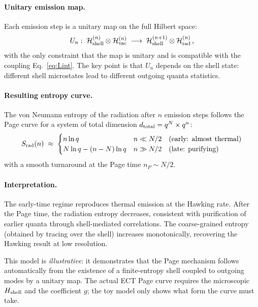 \documentclass[11pt,a4paper]{article}
\numberwithin{equation}{section}
\begin{document}
\paragraph{Unitary emission map.}
Each emission step is a unitary map on the full Hilbert space:
\begin{equation}
U_n:\;
\mathcal{H}_{\rm shell}^{(n)}\otimes\mathcal{H}_{\rm vac}^{(n)}
\;\longrightarrow\;
\mathcal{H}_{\rm shell}^{(n+1)}\otimes\mathcal{H}_{\rm rad}^{(n)}\,,
\label{eq:emission_map}
\end{equation}
with the only constraint that the map is unitary and is compatible with
the coupling Eq.~\eqref{eq:Lint}.
The key point is that $U_n$ depends on the shell state: different shell
microstates lead to different outgoing quanta statistics.

\paragraph{Resulting entropy curve.}
The von Neumann entropy of the radiation after $n$ emission steps follows
the Page curve for a system of total dimension
$d_{\rm total} = q^N \times q^n$:
\begin{equation}
S_{\rm rad}(n)
\;\approx\;
\begin{cases}
n\ln q & n \ll N/2\quad(\text{early: almost thermal})\\
N\ln q - (n-N)\ln q & n \gg N/2\quad(\text{late: purifying})
\end{cases}
\label{eq:toy_page}
\end{equation}
with a smooth turnaround at the Page time $n_P \sim N/2$.

\paragraph{Interpretation.}
The early-time regime reproduces thermal emission at the Hawking rate.
After the Page time, the radiation entropy decreases, consistent with
purification of earlier quanta through shell-mediated correlations.
The coarse-grained entropy (obtained by tracing over the shell) increases
monotonically, recovering the Hawking result at low resolution.

This model is \emph{illustrative}: it demonstrates that the Page mechanism
follows automatically from the existence of a finite-entropy shell coupled to
outgoing modes by a unitary map.
The actual ECT Page curve requires the microscopic $H_{\rm shell}$ and
the coefficient $g$; the toy model only shows what form the curve must take.
\end{document}

